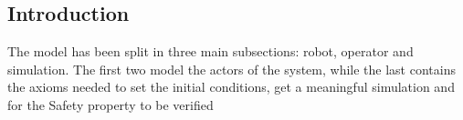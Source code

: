 \subsection{Introduction}
The model has been split in three main subsections: robot, operator and simulation. The first two model the actors of the system, while the last contains the axioms needed to set the initial conditions, get a meaningful simulation and for the Safety property to be verified
